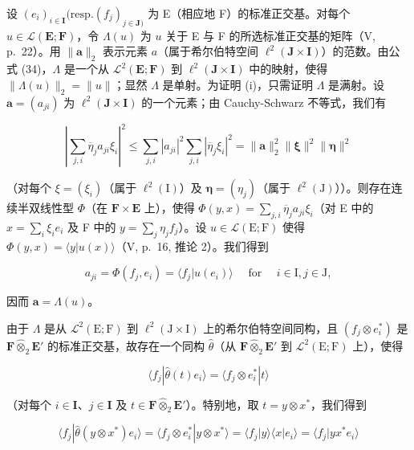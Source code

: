 设 \((e_i)_{i\in \mathbf{I}}(\mathrm{resp.}(f_j)_{j\in \mathbf{J})}\) 为 E（相应地 F）的标准正交基。对每个 \(u\in \mathcal{L}(\mathbf{E};\mathbf{F})\)，令 \(\Lambda (u)\) 为 \(u\) 关于 E 与 F 的所选标准正交基的矩阵（V, p.~22）。用 \(\| \mathbf{a}\| _2\) 表示元素 \(a\)（属于希尔伯特空间 \(\ell^2 (\mathbf{J}\times \mathbf{I})\)）的范数。由公式 (34)，\(\Lambda\) 是一个从 \(\mathcal{L}^2 (\mathbf{E};\mathbf{F})\) 到 \(\ell^2 (\mathbf{J}\times \mathbf{I})\) 中的映射，使得 \(\| \Lambda (u)\| _2 = \| u\|\)；显然 \(\Lambda\) 是单射。为证明 (i)，只需证明 \(\Lambda\) 是满射。设 \(\mathbf{a} = (a_{ji})\) 为 \(\ell^2 (\mathbf{J}\times \mathbf{I})\) 的一个元素；由 Cauchy-Schwarz 不等式，我们有

\[
\left| \sum_ {j, i} \overline {{{{\eta}}}} _ {j} a _ {j i} \xi_ {i} \right| ^ {2} \leqslant \sum_ {j, i} | a _ {j i} | ^ {2} \sum_ {j, i} | \overline {{{{\eta}}}} _ {j} \xi_ {i} | ^ {2} = \| \mathbf {a} \| _ {2} ^ {2} \| \boldsymbol {\xi} \| ^ {2} \| \boldsymbol {\eta} \| ^ {2}
\]

（对每个 \(\xi = (\xi_i)\)（属于 \(\ell^2 (\mathrm{I})\)）及 \(\pmb{\eta} = (\eta_j)\)（属于 \(\ell^2 (\mathrm{J})\)））。则存在连续半双线性型 \(\Phi\)（在 \(\mathbf{F}\times \mathbf{E}\) 上），使得 \(\Phi (y,x) = \sum_{j,i}\overline{\eta}_ja_{ji}\xi_i\)（对 E 中的 \(x = \sum_{i}\xi_{i}e_{i}\) 及 F 中的 \(y = \sum_{j}\eta_{j}f_{j}\)）。设 \(u\in \mathcal{L}(\mathrm{E};\mathrm{F})\) 使得 \(\Phi (y,x) = \langle y|u(x)\rangle\)（V, p.~16, 推论 2）。我们得到

\[
a _ {j i} = \Phi (f _ {j}, e _ {i}) = \langle f _ {j} | u (e _ {i}) \rangle \quad \text { for } \quad i \in \mathrm{I}, j \in \mathrm{J}  ,
\]

因而 \(\mathbf{a} = \Lambda(u)\)。

由于 \(\Lambda\) 是从 \(\mathcal{L}^2 (\mathrm{E};\mathrm{F})\) 到 \(\ell^2 (\mathrm{J}\times \mathrm{I})\) 上的希尔伯特空间同构，且 \((f_j\otimes e_i^*)\) 是 \(\mathbf{F}\hat{\otimes}_2\mathbf{E}'\) 的标准正交基，故存在一个同构 \(\hat{\theta}\)（从 \(\mathbf{F}\hat{\otimes}_2\mathbf{E}'\) 到 \(\mathcal{L}^2 (\mathrm{E};\mathrm{F})\) 上），使得

\[
\langle f _ {j} | \hat {\theta} (t) e _ {i} \rangle = \langle f _ {j} \otimes e _ {i} ^ {*} | t \rangle
\]

（对每个 \(i \in \mathbf{I}\)、\(j \in \mathbf{I}\) 及 \(t \in \mathbf{F} \hat{\otimes}_2 \mathbf{E}'\)）。特别地，取 \(t = y \otimes x^*\)，我们得到

\[
\langle f _ {j} | \hat {\theta} (y \otimes x ^ {*}) e _ {i} \rangle = \langle f _ {j} \otimes e _ {i} ^ {*} | y \otimes x ^ {*} \rangle = \langle f _ {j} | y \rangle \langle x | e _ {i} \rangle = \langle f _ {j} | y x ^ {*} e _ {i} \rangle
\]

